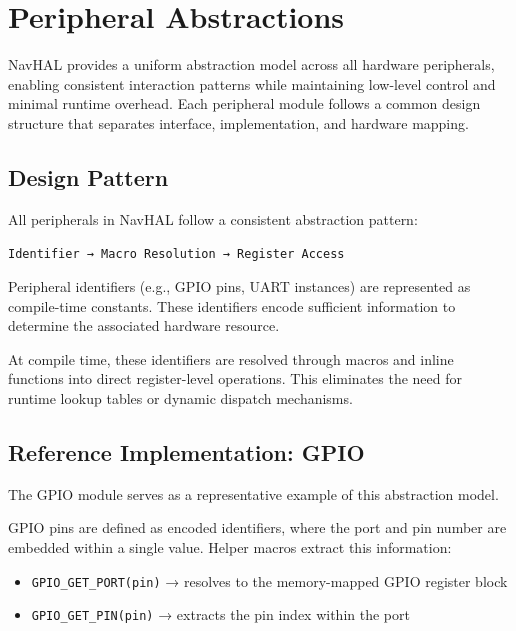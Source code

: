 \section{Peripheral Abstractions}
\label{sec:navhal_peripherals}

NavHAL provides a uniform abstraction model across all hardware peripherals, enabling consistent interaction patterns while maintaining low-level control and minimal runtime overhead. Each peripheral module follows a common design structure that separates interface, implementation, and hardware mapping.

\subsection*{Design Pattern}

All peripherals in NavHAL follow a consistent abstraction pattern:

\begin{center}
\texttt{Identifier → Macro Resolution → Register Access}
\end{center}

Peripheral identifiers (e.g., GPIO pins, UART instances) are represented as compile-time constants. These identifiers encode sufficient information to determine the associated hardware resource.

At compile time, these identifiers are resolved through macros and inline functions into direct register-level operations. This eliminates the need for runtime lookup tables or dynamic dispatch mechanisms.

\subsection*{Reference Implementation: GPIO}

The GPIO module serves as a representative example of this abstraction model.

GPIO pins are defined as encoded identifiers, where the port and pin number are embedded within a single value. Helper macros extract this information:

\begin{itemize}
    \item \texttt{GPIO\_GET\_PORT(pin)} → resolves to the memory-mapped GPIO register block
    \item \texttt{GPIO\_GET\_PIN(pin)} → extracts the pin index within the port
\end{itemize}

